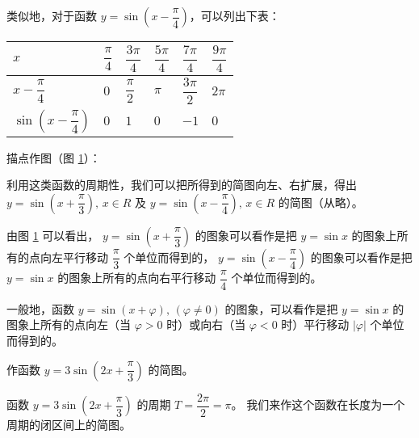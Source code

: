 类似地，对于函数 $y = \sin \left( x - \dfrac \pi 4 \right)$，可以列出下表：

\begin{table}[H]
\renewcommand\arraystretch{2}
\begin{tabular}{|w{c}{8em}|*{5}{w{c}{3em}|}}
    \hline
    $x$ & $\dfrac \pi 4$ & $\dfrac{3\pi}{4}$ & $\dfrac{5\pi}{4}$ & $\dfrac{7\pi}{4}$ & $\dfrac{9\pi}{4}$ \\ \hline
    $x - \dfrac \pi 4$ & $0$ & $\dfrac \pi 2$ & $\pi$ & $\dfrac{3\pi}{2}$ & $2\pi$ \\ \hline
    $\sin \left( x - \dfrac \pi 4 \right)$ & $0$ & $1$ & $0$ & $-1$ & $0$ \\ \hline
\end{tabular}
\end{table}

描点作图（图 \ref{fig:2-25}）：

\begin{figure}[htbp]
    \centering
    
    \caption{}\label{fig:2-25}
\end{figure}

利用这类函数的周期性，我们可以把所得到的简图向左、右扩展，得出
$y = \sin \left( x + \dfrac \pi 3 \right), \, x \in R$ 及
$y = \sin \left( x - \dfrac \pi 4 \right), \, x \in R$ 的简图（从略）。
\vspace{0.5em}

由图 \ref{fig:2-25} 可以看出，
$y = \sin \left( x + \dfrac \pi 3 \right)$ \vspace{0.5em} 的图象可以看作是把 $y = \sin x$ 的图象上所有的点向左平行移动 $\dfrac \pi 3$ 个单位而得到的，
$y = \sin \left( x - \dfrac \pi 4 \right)$ \vspace{0.5em} 的图象可以看作是把 $y = \sin x$ 的图象上所有的点向右平行移动 $\dfrac \pi 4$ 个单位而得到的。
\vspace{0.5em}

一般地，函数 $y = \sin(x + \varphi), \, (\varphi \neq 0)$ 的图象，可以看作是把 $y = \sin x$
的图象上所有的点向左（当 $\varphi > 0 $ 时）或向右（当 $\varphi < 0$ 时）平行移动 $|\varphi|$ 个单位而得到的。

\vspace{0.5em}
\liti 作函数 $y = 3\sin \left( 2x + \dfrac \pi 3 \right)$ 的简图。
\vspace{0.5em}

\jie 函数 $y = 3\sin \left( 2x + \dfrac \pi 3 \right)$ 的周期 $T = \dfrac{2\pi}{2} = \pi$。
我们来作这个函数在长度为一个周期的闭区间上的简图。

